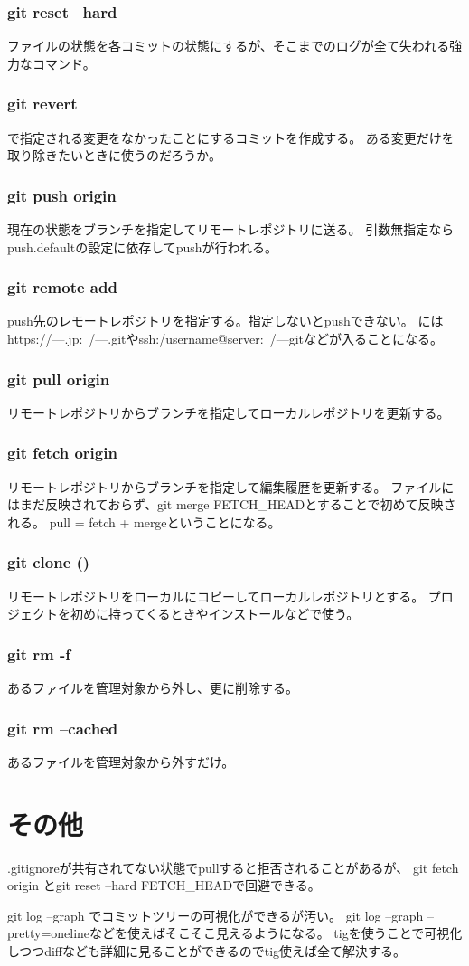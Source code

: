 \subsubsection{git reset --hard }
ファイルの状態を各コミットの状態にするが、そこまでのログが全て失われる強力なコマンド。
\subsubsection{git revert }
で指定される変更をなかったことにするコミットを作成する。
ある変更だけを取り除きたいときに使うのだろうか。
\subsubsection{git push origin }
現在の状態をブランチを指定してリモートレポジトリに送る。
引数無指定ならpush.defaultの設定に依存してpushが行われる。
\subsubsection{git remote add }
push先のレモートレポジトリを指定する。指定しないとpushできない。
にはhttps://---.jp:~/---.gitやssh:/username@server:~/---gitなどが入ることになる。
\subsubsection{git pull origin }
リモートレポジトリからブランチを指定してローカルレポジトリを更新する。
\subsubsection{git fetch origin }
リモートレポジトリからブランチを指定して編集履歴を更新する。
ファイルにはまだ反映されておらず、git merge FETCH\_HEADとすることで初めて反映される。
pull = fetch + mergeということになる。
\subsubsection{git clone  ()}
リモートレポジトリをローカルにコピーしてローカルレポジトリとする。
プロジェクトを初めに持ってくるときやインストールなどで使う。
\subsubsection{git rm  -f}
あるファイルを管理対象から外し、更に削除する。
\subsubsection{git rm --cached }
あるファイルを管理対象から外すだけ。

\section{その他}
.gitignoreが共有されてない状態でpullすると拒否されることがあるが、
git fetch origin とgit reset --hard FETCH\_HEADで回避できる。

git log --graph でコミットツリーの可視化ができるが汚い。
git log --graph --pretty=onelineなどを使えばそこそこ見えるようになる。
tigを使うことで可視化しつつdiffなども詳細に見ることができるのでtig使えば全て解決する。





